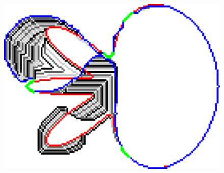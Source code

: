 \begin{figure}[h!]
\begin{minipage}[c]{0.32\textwidth}
{	\includegraphics[scale=0.19]{figures/chapter5/sqc/fixed-points/flower-1/summary.pdf}}\\
\end{minipage}
%
\begin{minipage}[c]{0.32\textwidth}
	\center
	\subfloat[\label{fig:fixed-c}]{
}
\end{minipage}
\end{figure}
